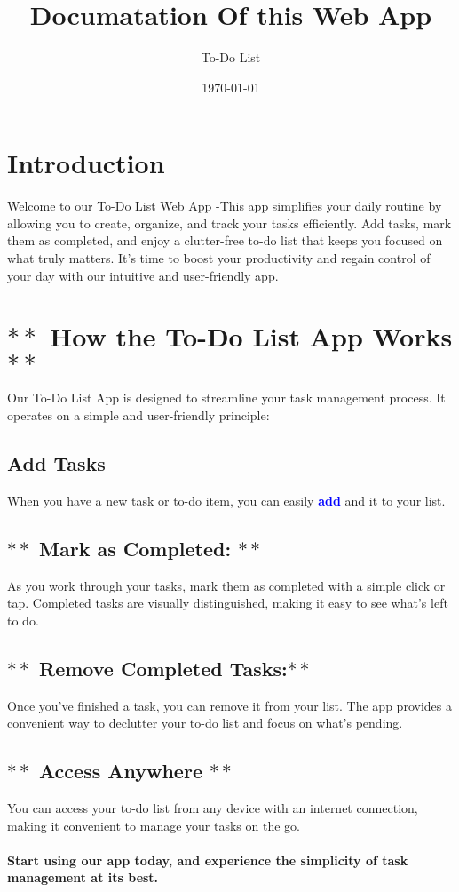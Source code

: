 \documentclass{article}
\title{Documatation Of this Web App}
\author{To-Do List}
\date{\today}
\begin{document}
\maketitle

\section{Introduction}
Welcome to our To-Do List Web App -This app simplifies your daily routine by allowing you to create, organize, and track your tasks efficiently. Add tasks, mark them as completed, and enjoy a clutter-free to-do list that keeps you focused on what truly matters. It's time to boost your productivity and regain control of your day with our intuitive and user-friendly app.
\section{$**$ How the To-Do List App Works $**$}
Our To-Do List App is designed to streamline your task management process. It operates on a simple and user-friendly principle:
\subsection{Add Tasks}
When you have a new task or to-do item, you can easily \textbf{\textcolor{blue}{add}} and  it to your list.

\subsection{$**$ Mark as Completed: $**$ }
As you work through your tasks, mark them as completed with a simple click or tap. Completed tasks are visually distinguished, making it easy to see what's left to do.

\subsection{$**$ Remove Completed Tasks:$**$ }
Once you've finished a task, you can remove it from your list. The app provides a convenient way to declutter your to-do list and focus on what's pending.

\subsection{$**$ Access Anywhere $**$ }
You can access your to-do list from any device with an internet connection, making it convenient to manage your tasks on the go.
\paragraph{Start using our app today, and experience the simplicity of task management at its best.}
\end{document}
